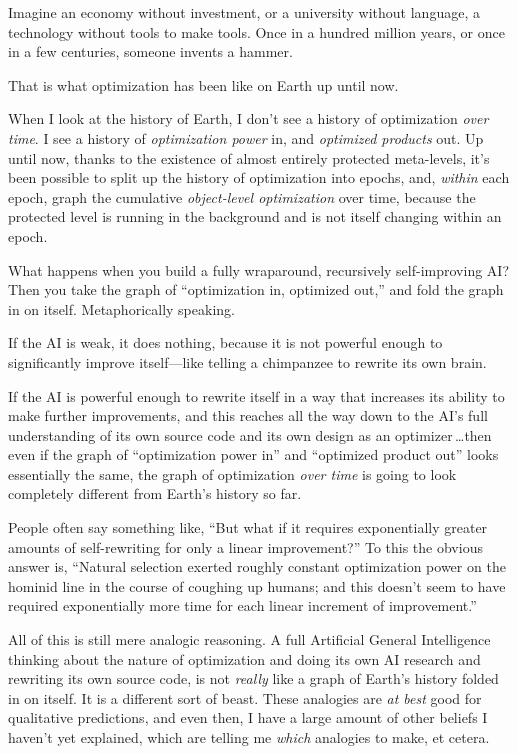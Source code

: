  Imagine an economy without investment, or a university without
language, a technology without tools to make tools. Once in a hundred
million years, or once in a few centuries, someone invents a hammer.


 That is what optimization has been like on Earth up until now.


 When I look at the history of Earth, I don't see a
history of optimization \textit{over time}. I see a history of
\textit{optimization power} in, and \textit{optimized products} out. Up
until now, thanks to the existence of almost entirely protected
meta-levels, it's been possible to split up the history
of optimization into epochs, and, \textit{within} each epoch, graph the
cumulative \textit{object-level optimization} over time, because the
protected level is running in the background and is not itself changing
within an epoch.


 What happens when you build a fully wraparound, recursively
self-improving AI? Then you take the graph of
``optimization in, optimized out,''
and fold the graph in on itself. Metaphorically speaking.


 If the AI is weak, it does nothing, because it is not powerful
enough to significantly improve itself---like telling a chimpanzee to
rewrite its own brain.


 If the AI is powerful enough to rewrite itself in a way that
increases its ability to make further improvements, and this reaches
all the way down to the AI's full understanding of its
own source code and its own design as an optimizer\,\ldots then even if
the graph of ``optimization power
in'' and ``optimized product
out'' looks essentially the same, the graph of
optimization \textit{over time} is going to look completely different
from Earth's history so far.


 People often say something like, ``But what if it
requires exponentially greater amounts of self-rewriting for only a
linear improvement?'' To this the obvious answer is,
``Natural selection exerted roughly constant
optimization power on the hominid line in the course of coughing up
humans; and this doesn't seem to have required
exponentially more time for each linear increment of
improvement.''


 All of this is still mere analogic reasoning. A full Artificial
General Intelligence thinking about the nature of optimization and
doing its own AI research and rewriting its own source code, is not
\textit{really} like a graph of Earth's history folded
in on itself. It is a different sort of beast. These analogies are
\textit{at best} good for qualitative predictions, and even then, I
have a large amount of other beliefs I haven't yet
explained, which are telling me \textit{which} analogies to make, et
cetera.


